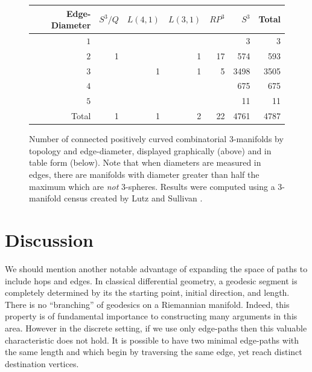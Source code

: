 \documentclass[12pt]{article}
\begin{document}
\begin{figure}
    \begin{center}
    {
	    \setlength\fboxsep{15pt}
		\setlength\fboxrule{0pt}
    }
    \renewcommand{\arraystretch}{1.2}
	\begin{tabular} {| r | r | r | r | r | r | r |}	
		\hline
		Edge-Diameter & $S^{3}/Q$ & $L(4,1)$ & $L(3,1)$ & $RP^{3}$ & $S^{3}$ & Total \\
		\hline
		\hline
		$1$ &  &  &  &   &3    & 3    \\
		$2$ & 1&  &1 &17 &574  & 593  \\
		$3$ &  &1 &1 &5  &3498 & 3505 \\
		$4$ &  &  &  &   &675  & 675   \\
		$5$ &  &  &  &   &11   & 11   \\
		\hline
		Total&1 &1 &2 &22   &4761   &4787  \\
		\hline
	\end{tabular}
    \end{center}
    \caption{Number of connected positively curved combinatorial 3-manifolds by topology and edge-diameter, displayed graphically (above) and in table form (below). Note that when diameters are measured in edges, there are manifolds with diameter greater than half the maximum which are {\em not} 3-spheres. Results were computed using a 3-manifold census created by Lutz and Sullivan \cite{LutzSul_unpub}.}
	\label{fig:type_statistics_edges}
\end{figure}

\section{Discussion}
We should mention another notable advantage of expanding the space of paths to include hops and edges. In classical differential geometry, a geodesic segment is completely determined by its the starting point, initial direction, and length. There is no ``branching'' of geodesics on a Riemannian manifold. Indeed, this property is of fundamental importance to constructing many arguments in this area. However in the discrete setting, if we use only edge-paths then this valuable characteristic does not hold. It is possible to have two minimal edge-paths with the same length and which begin by traversing the same edge, yet reach distinct destination vertices.
\end{document}
